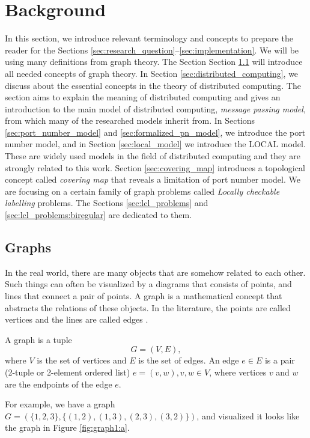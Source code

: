 
\section{Background} \label{sec:background}
In this section, we introduce relevant terminology and concepts to prepare the reader for the Sections \ref{sec:research_question}--\ref{sec:implementation}.
%
We will be using many definitions from graph theory.
The Section Section \ref{sec:graphs} will introduce all needed concepts of graph theory.
%
In Section \ref{sec:distributed_computing}, we discuss about the essential concepts in the theory of distributed computing.
The section aims to explain the meaning of distributed computing and gives an introduction to the main model of distributed computing, \emph{message passing model}, from which many of the researched models inherit from.
%
In Sections \ref{sec:port_number_model} and \ref{sec:formalized_pn_model}, we introduce the port number model, and in Section \ref{sec:local_model} we introduce the LOCAL model.
These are widely used models in the field of distributed computing and they are strongly related to this work.
%
Section \ref{sec:covering_map} introduces a topological concept called \emph{covering map} that reveals a limitation of port number model.
%
We are focusing on a certain family of graph problems called \emph{Locally checkable labelling} problems.
The Sections \ref{sec:lcl_problems} and \ref{sec:lcl_problems:biregular} are dedicated to them.


\subsection{Graphs} \label{sec:graphs}
In the real world, there are many objects that are somehow related to each other.
Such things can often be visualized by a diagrams that consists of points, and lines that connect a pair of points.
A graph is a mathematical concept that abstracts the relations of these objects.
In the literature, the points are called vertices and the lines are called edges
\cite{DBLP:books/others/BondyM76}.

\begin{definition}
A graph is a tuple $$G = (V, E),$$ where $V$ is the set of vertices and $E$ is the set of edges.
An edge $e \in E$ is a pair (2-tuple or 2-element ordered list) $e=(v, w), v, w \in V$, where vertices $v$ and $w$ are the endpoints of the edge $e$.
\end{definition}
For example, we have a graph $G=(\{1, 2, 3\}, \{(1, 2),(1, 3),(2, 3),(3, 2)\})$, and visualized it looks like the graph in Figure \ref{fig:graph1:a}.

